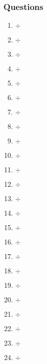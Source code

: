 \subsubsection{Questions}

\noindent\begin{minipage}[t]{7cm}
\begin{enumerate}
\item \meu{} \zo{} \ga{} \bu{} 	$\div$ \meu{} \zo{} \zo{}
\item \zo{} \bu{} \zo{} \meu{} 	$\div$ \zo{} \ga{} \bu{} 
\item \zo{} \bu{} \bu{} \zo{} 	$\div$ \zo{} \bu{} \ga{}
\item \zo{} \meu{} \bu{} \zo{} 	$\div$ \bu{} \ga{} \meu{} 
\item \meu{} \ga{} \zo{} \meu{} $\div$ \meu{} \ga{} \zo{} 
\item \bu{} \zo{} \bu{} \zo{} 	$\div$ \bu{} \ga{} \zo{}
\item \bu{} \ga{} \zo{} \meu{} 	$\div$ \meu{} \zo{} \zo{}
\item \zo{} \meu{} \ga{} \zo{} 	$\div$ \bu{} \meu{} \zo{}
\item \bu{} \bu{} \zo{} \zo{} 	$\div$ \bu{} \ga{} \bu{}
\item \zo{} \zo{} \ga{} \meu{} 	$\div$ \bu{} \ga{} \ga{}
\item \zo{} \ga{} \zo{} \meu{} 	$\div$ \zo{} \ga{} \zo{}
\item \bu{} \zo{} \ga{} \bu{} 	$\div$ \bu{} \zo{} \zo{} 
\end{enumerate}
\end{minipage}
\hfill
\begin{minipage}[t]{7cm}
\begin{enumerate}\setcounter{enumi}{12}
\item \bu{} \meu{} \meu{} \ga{} $\div$ \bu{} \meu{} \ga{}
\item \bu{} \meu{} \bu{} \ga{} 	$\div$ \meu{} \zo{} \meu{}
\item \meu{} \zo{} \ga{} \bu{}	$\div$ \zo{} \bu{} \ga{}
\item \meu{} \ga{} \meu{} \bu{} $\div$ \bu{} \meu{} \ga{} 
\item \zo{} \bu{} \meu{} \meu{} $\div$ \bu{} \ga{} \bu{}
\item \zo{} \ga{} \meu{} \meu{} $\div$ \bu{} \zo{} \ga{} 
\item \bu{} \ga{} \zo{} \meu{}  $\div$ \bu{} \ga{} \zo{}
\item \meu{} \bu{} \bu{} \zo{}  $\div$ \meu{} \bu{} \ga{}
\item \bu{} \ga{} \meu{} \bu{}  $\div$ \bu{} \ga{} \ga{}
\item \zo{} \meu{} \meu{} \ga{} $\div$ \zo{} \meu{} \ga{}
\item \meu{} \zo{} \bu{} \meu{} $\div$ \zo{} \zo{} \zo{} 
\item \meu{} \meu{} \ga{} \zo{} $\div$ \zo{} \meu{} \meu{} 
\end{enumerate}
\end{minipage}

